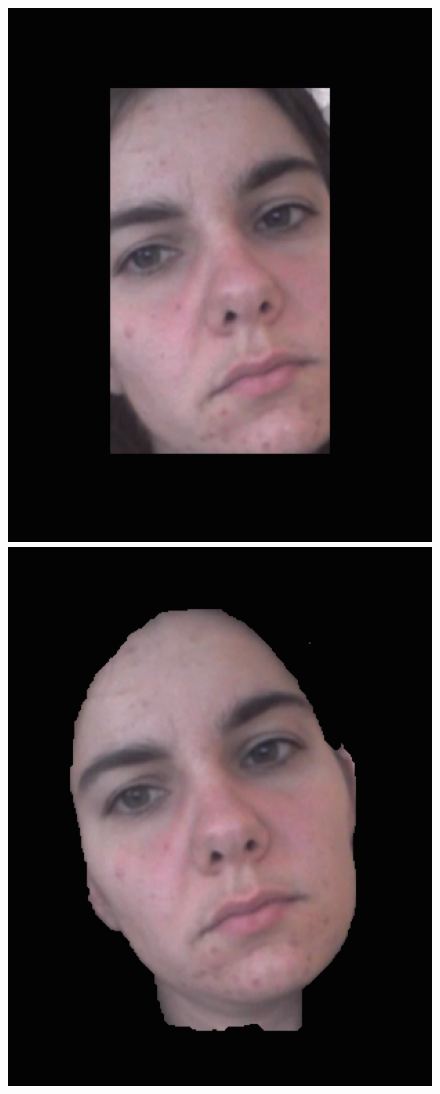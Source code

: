 \documentclass[10pt,twocolumn,letterpaper]{article}
\begin{document}
\begin{figure}
\begin{center}
	\includegraphics[scale=0.3]{figures/tilt_bb}
	\includegraphics[scale=0.3]{figures/tilt_segment}

\end{center}
\end{figure}
\end{document}
